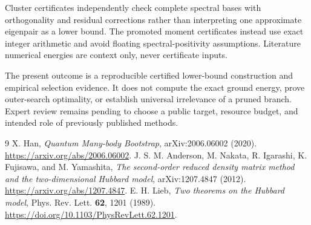 \documentclass[11pt]{article}
\begin{document}
Cluster certificates independently check complete spectral bases with orthogonality and residual corrections rather than interpreting one approximate eigenpair as a lower bound. The promoted moment certificates instead use exact integer arithmetic and avoid floating spectral-positivity assumptions. Literature numerical energies are context only, never certificate inputs.

The present outcome is a reproducible certified lower-bound construction and empirical selection evidence. It does not compute the exact ground energy, prove outer-search optimality, or establish universal irrelevance of a pruned branch. Expert review remains pending to choose a public target, resource budget, and intended role of previously published methods.

\begin{thebibliography}{9}
 X. Han, \emph{Quantum Many-body Bootstrap}, arXiv:2006.06002 (2020). \url{https://arxiv.org/abs/2006.06002}.
 J. S. M. Anderson, M. Nakata, R. Igarashi, K. Fujisawa, and M. Yamashita, \emph{The second-order reduced density matrix method and the two-dimensional Hubbard model}, arXiv:1207.4847 (2012). \url{https://arxiv.org/abs/1207.4847}.
 E. H. Lieb, \emph{Two theorems on the Hubbard model}, Phys. Rev. Lett. \textbf{62}, 1201 (1989). \url{https://doi.org/10.1103/PhysRevLett.62.1201}.
\end{thebibliography}
\end{document}
